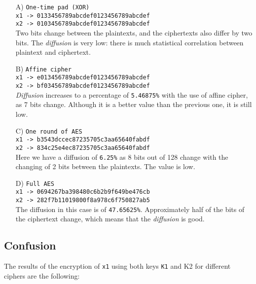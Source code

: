 \documentclass{article}
\begin{document}
\begin{itemize}
    \item [A)] \texttt{One-time pad (XOR)} \\
    \texttt{x1 -> 0133456789abcdef0123456789abcdef} \\
    \texttt{x2 -> 0103456789abcdef0123456789abcdef} \\
    Two bits change between the plaintexts, and the ciphertexts also differ by two bits. The \textit{diffusion} is very low: there is much statistical correlation between plaintext and ciphertext.
    
    \item [B)] \texttt{Affine cipher} \\
    \texttt{x1 -> e013456789abcdef0123456789abcdef} \\
    \texttt{x2 -> bf03456789abcdef0123456789abcdef} \\
    \textit{Diffusion} increases to a percentage of \texttt{5.46875\%} with the use of affine cipher, as 7 bits change. Although it is a better value than the previous one, it is still low.
    
    \item [C)] \texttt{One round of AES} \\
    \texttt{x1 -> b3543dccec87235705c3aa65640fabdf} \\
    \texttt{x2 -> 834c25e4ec87235705c3aa65640fabdf} \\
    Here we have a diffusion of \texttt{6.25\%} as 8 bits out of 128 change with the changing of 2 bits between the plaintexts. The value is low.
    
    \item [D)] \texttt{Full AES} \\
    \texttt{x1 -> 0694267ba398480c6b2b9f649be476cb} \\
    \texttt{x2 -> 282f7b11019800f8a978c6f750827ab5} \\
    The diffusion in this case is of \texttt{47.65625\%}. Approximately half of the bits of the ciphertext change, which means that the \textit{diffusion} is good.
    
\end{itemize}


\subsection{Confusion}
The results of the encryption of \texttt{x1} using both keys \texttt{K1} and {K2} for different ciphers are the following:
\end{document}
